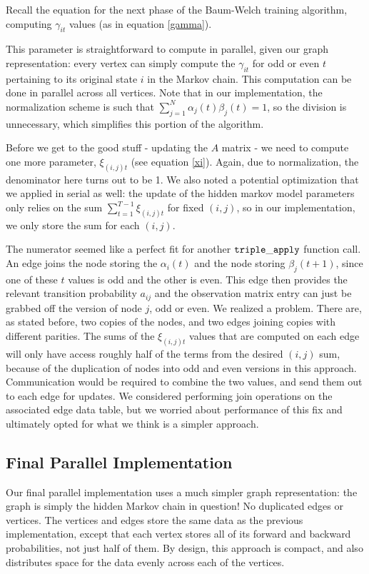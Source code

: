 Recall the equation for the next phase of the Baum-Welch training algorithm, computing $\gamma_{it}$ values (as in equation \ref{gamma}).

This parameter is straightforward to compute in parallel, given our graph representation: every vertex can simply compute the $\gamma_{it}$ for odd or even $t$ pertaining to its original state $i$ in the Markov chain.  This computation can be done in parallel across all vertices.   Note that in our implementation, the normalization scheme is such that $\sum_{j = 1}^N \alpha_{j}(t)\beta_{j}(t) = 1$, so the division is unnecessary, which simplifies this portion of the algorithm.

Before we get to the good stuff - updating the $A$ matrix - we need to compute one more parameter, $\xi_{(i,j)t}$ (see equation \ref{xi}).
Again, due to normalization, the denominator here turns out to be 1.  We also noted a potential optimization that we applied in serial as well: the update of the hidden markov model parameters only relies on the sum $\sum_{t = 1}^{T-1} \xi_{(i,j)t} $ for fixed $(i, j)$, so in our implementation, we only store the sum for each $(i, j)$.

The numerator seemed like a perfect fit for another $\tt{triple\_apply}$ function call.  An edge joins the node storing the $\alpha_{i}(t)$ and the node storing $\beta_{j}(t+1)$, since one of these $t$ values is odd and the other is even.  This edge then provides the relevant transition probability $a_{ij}$ and the observation matrix entry can just be grabbed off the version of node $j$, odd or even.  We realized a problem. There are, as stated before, two copies of the nodes, and two edges joining copies with different parities.  The sums of the $\xi_{(i,j)t}$ values that are computed on each edge will only have access roughly half of the terms from the desired $(i, j)$ sum, because of the duplication of nodes into odd and even versions in this approach.  Communication would be required to combine the two values, and send them out to each edge for updates.  We considered performing join operations on the associated edge data table, but we worried about performance of this fix and ultimately opted for what we think is a simpler approach.

\subsection{Final Parallel Implementation}

Our final parallel implementation uses a much simpler graph representation: the graph is simply the hidden Markov chain in question! No duplicated edges or vertices.  The vertices and edges store the same data as the previous implementation, except that each vertex stores all of its forward and backward probabilities, not just half of them.  By design, this approach is compact, and also distributes space for the data evenly across each of the vertices.

